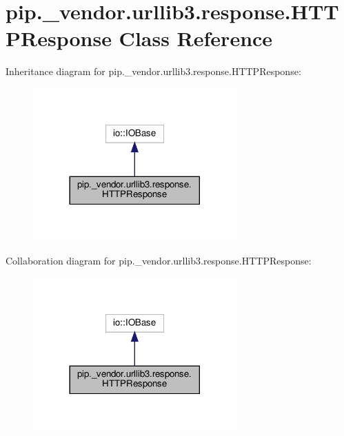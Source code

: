\hypertarget{classpip_1_1__vendor_1_1urllib3_1_1response_1_1HTTPResponse}{}\section{pip.\+\_\+vendor.\+urllib3.\+response.\+H\+T\+T\+P\+Response Class Reference}
\label{classpip_1_1__vendor_1_1urllib3_1_1response_1_1HTTPResponse}


Inheritance diagram for pip.\+\_\+vendor.\+urllib3.\+response.\+H\+T\+T\+P\+Response\+:
\nopagebreak
\begin{figure}[H]
\begin{center}
\leavevmode
\includegraphics[width=221pt]{classpip_1_1__vendor_1_1urllib3_1_1response_1_1HTTPResponse__inherit__graph}
\end{center}
\end{figure}


Collaboration diagram for pip.\+\_\+vendor.\+urllib3.\+response.\+H\+T\+T\+P\+Response\+:
\nopagebreak
\begin{figure}[H]
\begin{center}
\leavevmode
\includegraphics[width=221pt]{classpip_1_1__vendor_1_1urllib3_1_1response_1_1HTTPResponse__coll__graph}
\end{center}
\end{figure}

